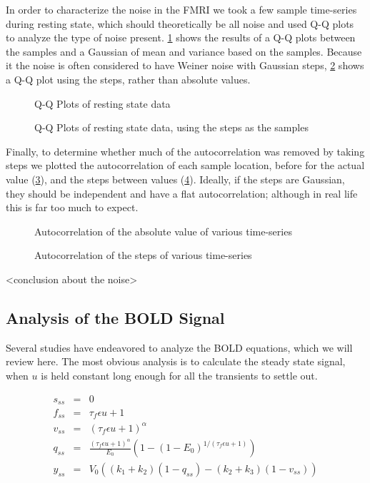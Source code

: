 \documentclass{article}
\begin{document}
In order to characterize the noise in the FMRI we took a few 
sample time-series during resting state, which should theoretically be all noise and 
used Q-Q plots to analyze the type of noise present. \ref{fig:QQDC} shows the 
results of a Q-Q plots between the samples and a Gaussian of mean and variance based
on the samples. Because it the noise is often considered to have Weiner noise with
Gaussian steps, \ref{fig:QQDelta} shows a Q-Q plot using the steps, rather than 
absolute values.
\begin{figure}
\label{fig:QQDC}
\caption{Q-Q Plots of resting state data}
\end{figure}

\begin{figure}
\label{fig:QQDelta}
\caption{Q-Q Plots of resting state data, using the steps as the samples}
\end{figure}

Finally, to determine whether much of the autocorrelation was removed by taking
steps we plotted the autocorrelation of each sample location, before for the
actual value (\ref{fig:CorrDC}), and the steps between values (\ref{fig:CorrDelta}).
Ideally, if the steps are Gaussian, they should be independent and have a
flat autocorrelation; although in real life this is far too much to expect.

\begin{figure}
\label{fig:CorrDC}
\caption{Autocorrelation of the absolute value of various time-series}
\end{figure}

\begin{figure}
\label{fig:CorrDelta}
\caption{Autocorrelation of the steps of various time-series}
\end{figure}

<conclusion about the noise>

\subsection{Analysis of the BOLD Signal}
Several studies have endeavored to analyze the BOLD equations, which
we will review here. The most obvious analysis is to calculate the
steady state signal, when $u$ is held constant long enough for
all the transients to settle out. 

\begin{eqnarray}
s_{ss} &=& 0 \nonumber \\
f_{ss} &=& \tau_f\epsilon u + 1\nonumber \\
v_{ss} &=& (\tau_f\epsilon u + 1)^\alpha\nonumber \\
q_{ss} &=& \frac{(\tau_f\epsilon u + 1)^\alpha}{E_0}(1-(1-E_0)^{1/(\tau_f\epsilon u + 1)})\nonumber \\
y_{ss} &=& V_0((k_1+k_2)(1-q_{ss}) - (k_2+k_3)(1-v_{ss}))
\label{steadystate}
\end{eqnarray}
\end{document}
